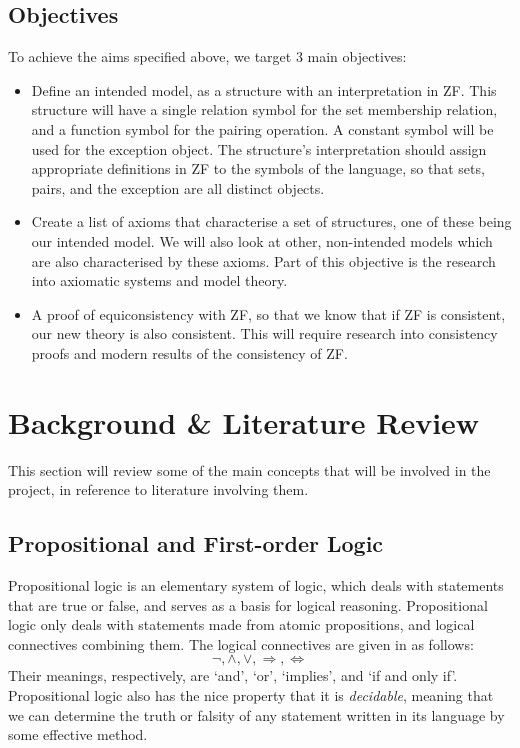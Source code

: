 \documentclass[11pt]{article}
\theoremstyle{definition}
\theoremstyle{theorem}
\theoremstyle{lemma}
\begin{document}
\subsection{Objectives}
To achieve the aims specified above, we target 3 main objectives:
\begin{itemize}
  \item Define an intended model, as a structure with an interpretation in ZF. This structure will have a single relation symbol for the set membership relation, and a function symbol for the pairing operation.
  A constant symbol will be used for the exception object.
  The structure's interpretation should assign appropriate definitions in ZF to the symbols of the language, so that sets, pairs, and the exception are all distinct objects.

  \item Create a list of axioms that characterise a set of structures, one of these being our intended model.
  We will also look at other, non-intended models which are also characterised by these axioms.
  Part of this objective is the research into axiomatic systems and model theory.

  \item A proof of equiconsistency with ZF, so that we know that if ZF is consistent, our new theory is also consistent.
  This will require research into consistency proofs and modern results of the consistency of ZF.
\end{itemize}

\section{Background \& Literature Review}
This section will review some of the main concepts that will be involved in the project, in reference to literature involving them.

\subsection{Propositional and First-order Logic}
Propositional logic is an elementary system of logic, which deals with statements that are true or false, and serves as a basis for logical reasoning. Propositional logic only deals with statements made from atomic propositions, and logical connectives combining them. The logical connectives are given in \cite[p.~2]{beckert} as follows:
$$\neg, \wedge, \vee,\Rightarrow,\Leftrightarrow$$
Their meanings, respectively, are `and', `or', `implies', and `if and only if'.
Propositional logic also has the nice property that it is \emph{decidable}, meaning that we can determine the truth or falsity of any statement written in its language by some effective method.
\end{document}
